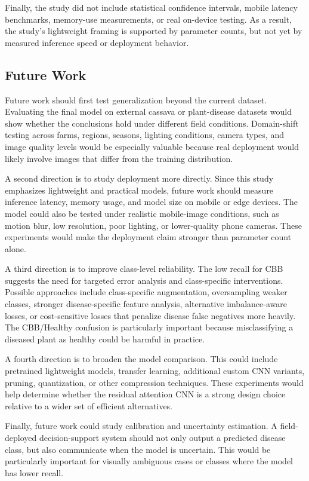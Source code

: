 \documentclass[11pt]{article}
\begin{document}
Finally, the study did not include statistical confidence intervals, mobile latency benchmarks, memory-use measurements, or real on-device testing. As a result, the study's lightweight framing is supported by parameter counts, but not yet by measured inference speed or deployment behavior.

\subsection{Future Work}

Future work should first test generalization beyond the current dataset. Evaluating the final model on external cassava or plant-disease datasets would show whether the conclusions hold under different field conditions. Domain-shift testing across farms, regions, seasons, lighting conditions, camera types, and image quality levels would be especially valuable because real deployment would likely involve images that differ from the training distribution.

A second direction is to study deployment more directly. Since this study emphasizes lightweight and practical models, future work should measure inference latency, memory usage, and model size on mobile or edge devices. The model could also be tested under realistic mobile-image conditions, such as motion blur, low resolution, poor lighting, or lower-quality phone cameras. These experiments would make the deployment claim stronger than parameter count alone.

A third direction is to improve class-level reliability. The low recall for CBB suggests the need for targeted error analysis and class-specific interventions. Possible approaches include class-specific augmentation, oversampling weaker classes, stronger disease-specific feature analysis, alternative imbalance-aware losses, or cost-sensitive losses that penalize disease false negatives more heavily. The CBB/Healthy confusion is particularly important because misclassifying a diseased plant as healthy could be harmful in practice.

A fourth direction is to broaden the model comparison. This could include pretrained lightweight models, transfer learning, additional custom CNN variants, pruning, quantization, or other compression techniques. These experiments would help determine whether the residual attention CNN is a strong design choice relative to a wider set of efficient alternatives.

Finally, future work could study calibration and uncertainty estimation. A field-deployed decision-support system should not only output a predicted disease class, but also communicate when the model is uncertain. This would be particularly important for visually ambiguous cases or classes where the model has lower recall.
\end{document}
